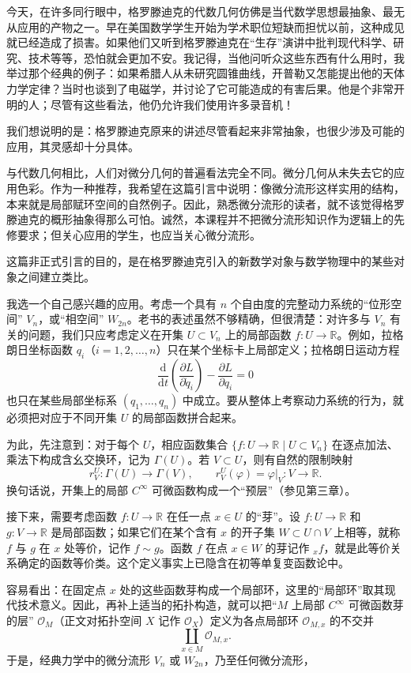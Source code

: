 今天，在许多同行眼中，格罗滕迪克的代数几何仿佛是当代数学思想最抽象、最无从应用的产物之一。早在美国数学学生开始为学术职位短缺而担忧以前，这种成见就已经造成了损害。如果他们又听到格罗滕迪克在“生存”演讲中批判现代科学、研究、技术等等，恐怕就会更加不安。我记得，当他问听众这些东西有什么用时，我举过那个经典的例子：如果希腊人从未研究圆锥曲线，开普勒又怎能提出他的天体力学定律？当时也谈到了电磁学，并讨论了它可能造成的有害后果。他是个非常开明的人；尽管有这些看法，他仍允许我们使用许多录音机！

我们想说明的是：格罗滕迪克原来的讲述尽管看起来非常抽象，也很少涉及可能的应用，其灵感却十分具体。

与代数几何相比，人们对微分几何的普遍看法完全不同。微分几何从未失去它的应用色彩。作为一种推荐，我希望在这篇引言中说明：像微分流形这样实用的结构，本来就是局部赋环空间的自然例子。因此，熟悉微分流形的读者，就不该觉得格罗滕迪克的概形抽象得那么可怕。诚然，本课程并不把微分流形知识作为逻辑上的先修要求；但关心应用的学生，也应当关心微分流形。

这篇非正式引言的目的，是在格罗滕迪克引入的新数学对象与数学物理中的某些对象之间建立类比。

我选一个自己感兴趣的应用。考虑一个具有 $n$ 个自由度的完整动力系统的“位形空间” $V_n$，或“相空间” $W_{2n}$。老书的表述虽然不够精确，但很清楚：对许多与 $V_n$ 有关的问题，我们只应考虑定义在开集 $U\subset V_n$ 上的局部函数 $f:U\to\mathbb R$。例如，拉格朗日坐标函数 $q_i$（$i=1,2,\ldots,n$）只在某个坐标卡上局部定义；拉格朗日运动方程
\[
\frac{\mathrm d}{\mathrm dt}\left(\frac{\partial L}{\partial\dot q_i}\right)
-\frac{\partial L}{\partial q_i}=0
\]
也只在某些局部坐标系 $(q_1,\ldots,q_n)$ 中成立。要从整体上考察动力系统的行为，就必须把对应于不同开集 $U$ 的局部函数拼合起来。

为此，先注意到：对于每个 $U$，相应函数集合 $\{f:U\to\mathbb R\mid U\subset V_n\}$ 在逐点加法、乘法下构成含幺交换环，记为 $\Gamma(U)$。若 $V\subset U$，则有自然的限制映射
\[
r_V^U:\Gamma(U)\longrightarrow\Gamma(V),\qquad
r_V^U(\varphi)=\varphi|_V:V\longrightarrow\mathbb R.
\]
换句话说，开集上的局部 $C^\infty$ 可微函数构成一个“预层”（参见第三章）。

接下来，需要考虑函数 $f:U\to\mathbb R$ 在任一点 $x\in U$ 的“芽”。设 $f:U\to\mathbb R$ 和 $g:V\to\mathbb R$ 是局部函数；如果它们在某个含有 $x$ 的开子集 $W\subset U\cap V$ 上相等，就称 $f$ 与 $g$ 在 $x$ 处等价，记作 $f\sim g$。函数 $f$ 在点 $x\in W$ 的芽记作 ${}_xf$，就是此等价关系确定的函数等价类。这个定义事实上已隐含在初等单复变函数论中。

容易看出：在固定点 $x$ 处的这些函数芽构成一个局部环，这里的“局部环”取其现代技术意义。因此，再补上适当的拓扑构造，就可以把“$M$ 上局部 $C^\infty$ 可微函数芽的层” $\mathcal O_M$（正文对拓扑空间 $X$ 记作 $\mathcal O_X$）定义为各点局部环 $\mathcal O_{M,x}$ 的不交并
\[
\coprod_{x\in M}\mathcal O_{M,x}.
\]
于是，经典力学中的微分流形 $V_n$ 或 $W_{2n}$，乃至任何微分流形，

